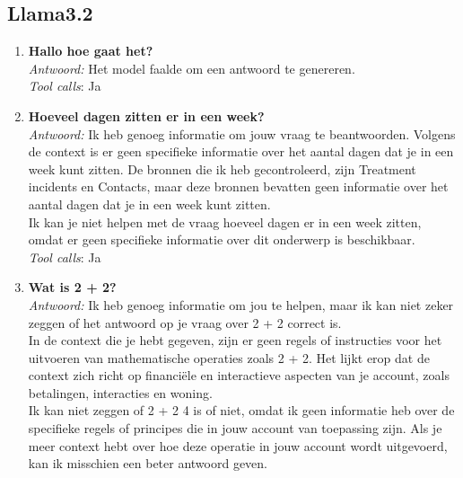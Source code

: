 \subsection{Llama3.2}
\begin{enumerate}
    \item \textbf{Hallo hoe gaat het?}\\
    \textit{Antwoord:} Het model faalde om een antwoord te genereren. \\
    \textit{Tool calls}: Ja
    \item \textbf{Hoeveel dagen zitten er in een week?}\\
    \textit{Antwoord:} Ik heb genoeg informatie om jouw vraag te beantwoorden. Volgens de context is er geen specifieke informatie over het aantal dagen dat je in een week kunt zitten. De bronnen die ik heb gecontroleerd, zijn Treatment  incidents en Contacts, maar deze bronnen bevatten geen informatie over het aantal dagen dat je in een week kunt zitten.\\
    
    Ik kan je niet helpen met de vraag hoeveel dagen er in een week zitten, omdat er geen specifieke informatie over dit onderwerp is beschikbaar.\\
    \textit{Tool calls}: Ja 
    \item \textbf{Wat is 2 + 2?}\\
    \textit{Antwoord:} Ik heb genoeg informatie om jou te helpen, maar ik kan niet zeker zeggen of het antwoord op je vraag over 2 + 2 correct is.\\
    
    In de context die je hebt gegeven, zijn er geen regels of instructies voor het uitvoeren van mathematische operaties zoals 2 + 2. Het lijkt erop dat de context zich richt op financiële en interactieve aspecten van je account, zoals betalingen, interacties en woning.\\
    
    Ik kan niet zeggen of 2 + 2 4 is of niet, omdat ik geen informatie heb over de specifieke regels of principes die in jouw account van toepassing zijn. Als je meer context hebt over hoe deze operatie in jouw account wordt uitgevoerd, kan ik misschien een beter antwoord geven.\\
    

\end{enumerate}
